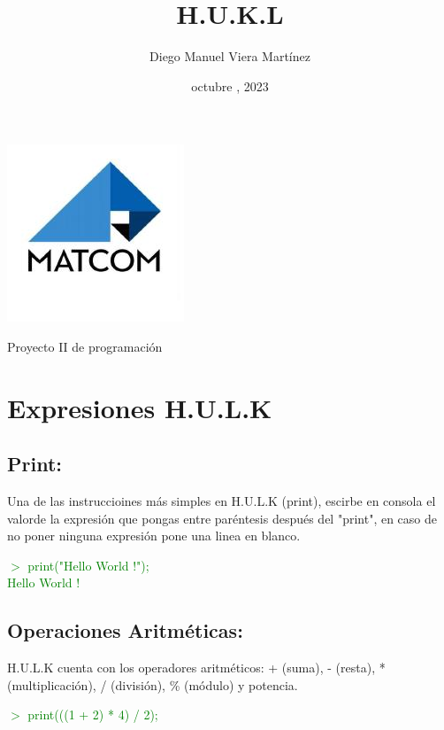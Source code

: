 \documentclass[a4paper,12pt]{article}
\begin{document}
\color{white}
\pagecolor{black}
    \ttfamily
    \title{\huge \textbf{H.U.K.L}}
    \author{Diego Manuel Viera Martínez}
    \date{octubre , 2023}
    \maketitle
    \begin{center}
        \includegraphics[scale=0.7]{Pictures/matcom.jpg}
        \label{fig:logo}
    \end{center}
    \begin{center}
        \large Proyecto II de programación
    \end{center}

    \newpage 
    
    \section{Expresiones H.U.L.K}\label{sec:Expresiones}
    \subsection{Print:}\label{sub:printExpression}
    \begin{center}
        Una de las instruccioines más simples en H.U.L.K (print),
    escirbe en consola el valorde la expresión que pongas entre
    paréntesis después del "print", en caso de no poner ninguna expresión
    pone una linea en blanco.
    \end{center}
    \textcolor{green}{$>$ print("Hello World !");}\\
    \textcolor{green}{Hello World !}
    

    \subsection{Operaciones Aritméticas:}\label{sub:aritmeticsOperations}
    \begin{flushleft}
        H.U.L.K cuenta con los operadores aritméticos: + (suma),  - (resta), 
        * (multiplicación), / (división), \% (módulo) y potencia.
    \end{flushleft}
    \textcolor{green}{$>$ print(((1 + 2) * 4) / 2);}
    
\end{document}
